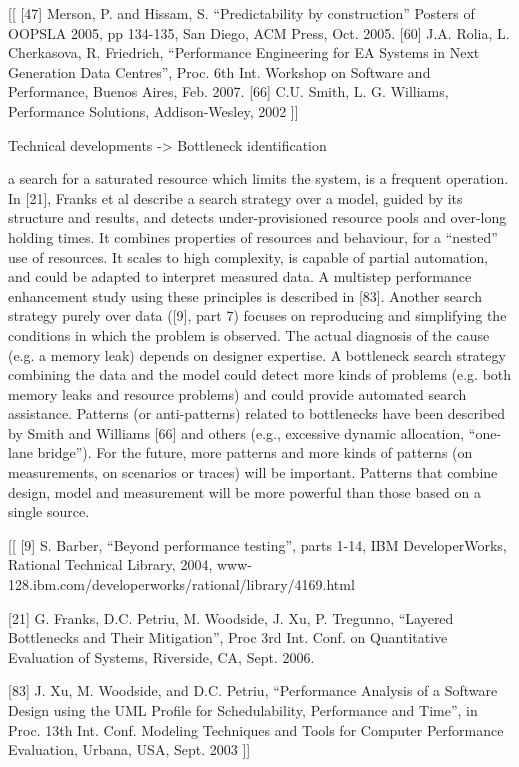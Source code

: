 \documentclass[runningheads,a4paper]{llncs}
\begin{document}
[[
[47] Merson, P. and Hissam, S. “Predictability by
construction” Posters of OOPSLA 2005, pp 134-135, San
Diego, ACM Press, Oct. 2005.
[60] J.A. Rolia, L. Cherkasova, R. Friedrich, “Performance
Engineering for EA Systems in Next Generation Data
Centres”, Proc. 6th Int. Workshop on Software and
Performance, Buenos Aires, Feb. 2007.
[66] C.U. Smith, L. G. Williams, Performance Solutions,
Addison-Wesley, 2002
]]


Technical developments -> Bottleneck identification

a search for a saturated
resource which limits the system, is a frequent
operation. In [21], Franks et al describe a search
strategy over a model, guided by its structure and
results, and detects under-provisioned resource pools
and over-long holding times. It combines properties of
resources and behaviour, for a “nested” use of
resources. It scales to high complexity, is capable of
partial automation, and could be adapted to interpret
measured data. A multistep performance enhancement
study using these principles is described in [83].
Another search strategy purely over data ([9], part 7)
focuses on reproducing and simplifying the conditions
in which the problem is observed. The actual diagnosis
of the cause (e.g. a memory leak) depends on designer
expertise.
A bottleneck search strategy combining the data and
the model could detect more kinds of problems (e.g.
both memory leaks and resource problems) and could
provide automated search assistance.
Patterns (or anti-patterns) related to bottlenecks have
been described by Smith and Williams [66] and others
(e.g., excessive dynamic allocation, “one-lane bridge”).
For the future, more patterns and more kinds of
patterns (on measurements, on scenarios or traces) will
be important. Patterns that combine design, model and
measurement will be more powerful than those based
on a single source.

[[
[9] S. Barber, “Beyond performance testing”, parts 1-14,
IBM DeveloperWorks, Rational Technical Library, 2004,
www-128.ibm.com/developerworks/rational/library/4169.html

[21] G. Franks, D.C. Petriu, M. Woodside, J. Xu, P.
Tregunno, “Layered Bottlenecks and Their Mitigation”, Proc
3rd Int. Conf. on Quantitative Evaluation of Systems,
Riverside, CA, Sept. 2006.

[83] J. Xu, M. Woodside, and D.C. Petriu, “Performance
Analysis of a Software Design using the UML Profile for
Schedulability, Performance and Time”, in Proc. 13th Int.
Conf. Modeling Techniques and Tools for Computer
Performance Evaluation, Urbana, USA, Sept. 2003
]]
\end{document}
